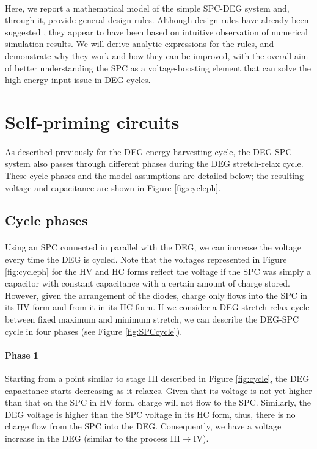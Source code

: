 \paragraph{}Here, we report a mathematical model of the simple SPC-DEG system and, through it, provide general design rules. Although design rules have already been suggested \cite{SPCdesign}, they appear to have been based on intuitive observation of numerical simulation results. We will derive analytic expressions for the rules, and demonstrate why they work and how they can be improved, with the overall aim of better understanding the SPC as a voltage-boosting element that can solve the high-energy input issue in DEG cycles.

\section{Self-priming circuits}

\paragraph{}  As described previously for the DEG energy harvesting cycle, the DEG-SPC system also passes through different phases during the DEG stretch-relax cycle. These cycle phases and the model assumptions are detailed below; the resulting voltage and capacitance are shown in Figure \ref{fig:cycleph}.

\subsection{Cycle phases}

\paragraph{} Using an SPC connected in parallel with the  DEG, we can increase the voltage every time the DEG is cycled.  Note that the voltages represented in Figure \ref{fig:cycleph} for the HV and HC forms reflect the voltage if the SPC was simply a capacitor with constant capacitance with a certain amount of charge stored. However, given the arrangement of the diodes,  charge only flows into the SPC in its HV form and from it in its HC form.  If we consider a DEG stretch-relax cycle between fixed  maximum and minimum stretch, we can describe the DEG-SPC cycle in four phases (see Figure \ref{fig:SPCcycle}).

\paragraph{Phase 1} Starting from a point similar to stage III described in Figure \ref{fig:cycle}, the DEG capacitance starts decreasing as it relaxes. Given that its voltage is not yet higher than that on the SPC in HV form, charge will not flow to the SPC. Similarly, the DEG voltage is higher than the SPC voltage in its HC form, thus, there is no charge flow from the SPC into the DEG. Consequently, we have a voltage increase in the DEG (similar to the process III$\rightarrow$IV).

